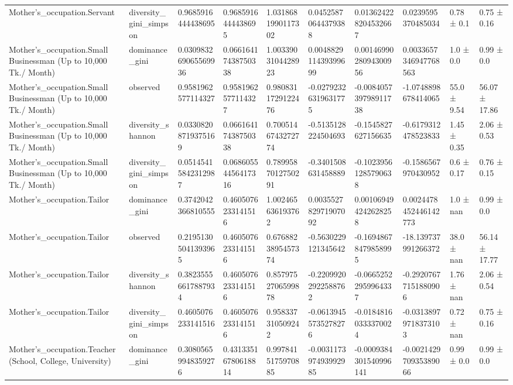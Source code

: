 \begin{longtable}{llllllllll}
Mother’s\_occupation.Servant & diversity\_gini\_simpson & 0.9685916444438695 & 0.9685916444438695 & 1.0318681990117302 & 0.04525870644379388 & 0.013624228204532667 & 0.0239595370485034 & 0.78 ± 0.1 & 0.75 ± 0.16 \\
Mother’s\_occupation.Small Businessman (Up to 10,000 Tk./ Month) & dominance\_gini & 0.030983269065569936 & 0.06616417438750338 & 1.0033903104428923 & 0.004882911439399699 & 0.0014699028094300956 & 0.0033657346947768563 & 1.0 ± 0.0 & 0.99 ± 0.0 \\
Mother’s\_occupation.Small Businessman (Up to 10,000 Tk./ Month) & observed & 0.9581962577114327 & 0.9581962577114327 & 0.9808311729122476 & -0.02792326319631775 & -0.008405739798911738 & -1.0748898678414065 & 55.0 ± 9.54 & 56.07 ± 17.86 \\
Mother’s\_occupation.Small Businessman (Up to 10,000 Tk./ Month) & diversity\_shannon & 0.03308208719375169 & 0.06616417438750338 & 0.7005146743272774 & -0.5135128224504693 & -0.1545827627156635 & -0.6179312478523833 & 1.45 ± 0.35 & 2.06 ± 0.53 \\
Mother’s\_occupation.Small Businessman (Up to 10,000 Tk./ Month) & diversity\_gini\_simpson & 0.05145415842312987 & 0.06860554456417316 & 0.7899587012750291 & -0.3401508631458889 & -0.10239561285790638 & -0.1586567970430952 & 0.6 ± 0.17 & 0.76 ± 0.15 \\
Mother’s\_occupation.Tailor & dominance\_gini & 0.3742042366810555 & 0.4605076233141516 & 1.002465636193762 & 0.003552782971907092 & 0.001069494242628258 & 0.0024478452446142773 & 1.0 ± nan & 0.99 ± 0.0 \\
Mother’s\_occupation.Tailor & observed & 0.21951305041393965 & 0.4605076233141516 & 0.6768823895457374 & -0.5630229121345642 & -0.16948678479858995 & -18.139737991266372 & 38.0 ± nan & 56.14 ± 17.77 \\
Mother’s\_occupation.Tailor & diversity\_shannon & 0.38235556617887934 & 0.4605076233141516 & 0.8579752706599878 & -0.22099202922588762 & -0.06652522959964337 & -0.29207677151880906 & 1.76 ± nan & 2.06 ± 0.54 \\
Mother’s\_occupation.Tailor & diversity\_gini\_simpson & 0.4605076233141516 & 0.4605076233141516 & 0.958337310509242 & -0.06139455735278276 & -0.01848160333370024 & -0.03138979718373103 & 0.72 ± nan & 0.75 ± 0.16 \\
Mother’s\_occupation.Teacher (School, College, University) & dominance\_gini & 0.30805659948359276 & 0.43133516780618814 & 0.9978415175970885 & -0.003117397493992985 & -0.0009384301540996141 & -0.002142970935389066 & 0.99 ± 0.0 & 0.99 ± 0.0 \\

\end{longtable}
